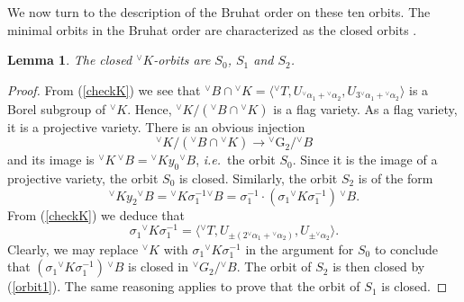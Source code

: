 \documentclass[a4paper, 11pt]{article}
\newtheorem{lem}[theo]{Lemma}
\begin{document}
We now turn to the description of the Bruhat order on these ten orbits.
The minimal orbits in the Bruhat order are characterized as the closed orbits
\cite[Proposition 8.3]{HumphLAG}.  
\begin{lem}
\label{closedorb}
The closed $^{\vee}K$-orbits are $S_{0}$, $S_{1}$ and $S_{2}$.
\end{lem}
\begin{proof}
From (\ref{checkK}) we see that
${^\vee}B \cap  {^\vee}K = \langle {^\vee}T, U_{{^\vee}\alpha_{1}+
 {^\vee}\alpha_{2}},  U_{3{^\vee}\alpha_{1}+ {^\vee}\alpha_{2}}
\rangle $ is a Borel subgroup of ${^\vee}K$.  Hence, ${^\vee}K /
({^\vee}B \cap {^\vee}K)$ is a flag variety.  As a flag variety, it is
a projective variety.  There is an obvious injection
$${^\vee}K /({^\vee}B \cap {^\vee}K) \rightarrow
{^\vee}\mathrm{G}_{2}/{^\vee}B$$
and its  image is ${^\vee}K\, {^\vee}B =   {^\vee}K
y_{0}{^\vee}B$, \emph{i.e.}~the orbit $S_{0}$.  Since it is the
image of a projective 
variety, the orbit $S_{0}$ is closed.  Similarly, the orbit $S_{2}$ is of the
form 
\begin{equation}
\label{orbit1}
{^\vee}K y_{2} {^\vee}B = {^\vee}K \sigma_{1}^{-1} {^\vee}B =
\sigma_{1}^{-1} \cdot 
(\sigma_{1} {^\vee}K \sigma_{1}^{-1}) \,{^\vee}B.
\end{equation} 
From (\ref{checkK}) we deduce that 
$$\sigma_{1} {^\vee}K \sigma_{1}^{-1} = \langle {^\vee}T, U_{\pm
  (2{^\vee}\alpha_{1}+ 
 {^\vee}\alpha_{2})},  U_{\pm {^\vee}\alpha_{2}} \rangle.$$
Clearly, we may replace ${^\vee}K$ with $\sigma_{1} {^\vee}K
\sigma_{1}^{-1}$ in the  argument for $S_{0}$ to conclude that
$(\sigma_{1} {^\vee}K \sigma_{1}^{-1}) \,{^\vee}B$ is closed in
${^\vee}G_{2}/ {^\vee}B$.  The orbit of $S_{2}$ is then closed by
(\ref{orbit1}).  The same reasoning applies to prove that the orbit of
$S_{1}$ is closed.
\end{proof}
\end{document}
